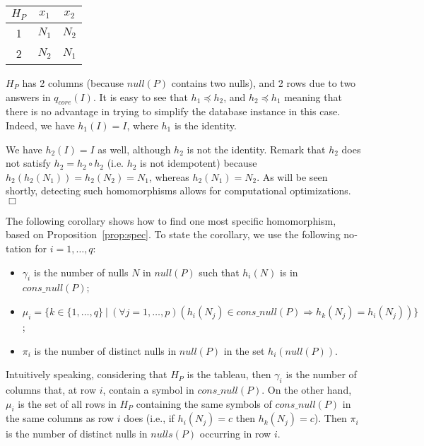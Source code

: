 \begin{otherlanguage}{english}
\begin{example}
{        \begin{center}
            \begin{tabular}{c|cc}
                $H_P$ & $x_1$  & $x_2$ \\ \hline
                1     & $N_1 $ & $N_2$ \\
                2     & $N_2 $ & $N_1$ \\
            \end{tabular}
        \end{center}

        $H_P$ has 2 columns (because $null(P)$ contains two nulls), and 2 rows due to two answers in $q_{core}(I)$.
        It is easy to see that $h_1 \preceq h_2$, and $h_2 \preceq h_1$ meaning that there is no advantage in trying to simplify the database instance in this case.
        Indeed, we have $h_1(I) = I$, where $h_1$ is the identity.

        We have $h_2(I) = I$ as well, although $h_2 $ is not the identity.
        Remark that $h_2$ does not satisfy $h_2 = h_2 \circ h_2$ (i.e. $h_2$ is not idempotent) because $h_2(h_2(N_1))=h_2(N_2)=N_1$, whereas $h_2(N_1)=N_2$.
        As will be seen shortly, detecting such homomorphisms allows for computational optimizations.
        \hfill$\Box$}
\end{example}

The following corollary shows how to find one most specific homomorphism, based on Proposition~\ref{prop:spec}.
To state the corollary, we use the following notation for $i=1, \ldots,q$:
\begin{itemize}
    \item
          $\gamma_i$ is the number of nulls $N$ in $null(P)$ such that $h_i(N)$ is in $cons\_null(P)$;
    \item
          $\mu_i=\{k \in \{1, \ldots, q\}~|~(\forall j=1, \ldots, p) (h_i(N_j) \in cons\_null(P) \Rightarrow h_k(N_j) = h_i(N_j))\}$;
    \item
          $\pi_i$ is the number of distinct nulls in $null(P)$ in the set $h_i(null(P))$.
\end{itemize}

Intuitively speaking, considering that $H_P$ is the tableau,  then $\gamma_i$ is the number of columns that, at row $i$, contain a symbol in $cons\_null(P)$.
On the other hand, $\mu_i$ is the set of all rows in $H_P$ containing the same symbols of $cons\_null(P)$ in the same columns as row $i$ does (i.e., if $h_i(N_j) = c$ then $h_k(N_j)=c$).
Then $\pi_i$ is the number of distinct nulls in $nulls(P)$ occurring in row $i$.


\end{otherlanguage}
